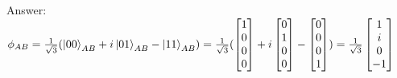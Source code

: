 \documentclass{article}
\begin{document}
\begin{enumerate}
          Answer:
          $\phi_{AB}=\frac{1}{\sqrt{3}}(\ket{00}_{AB} + i\ket{01}_{AB} - \ket{11}_{AB})
              \\=\frac{1}{\sqrt{3}}(
              \begin{bmatrix}
                  1 \\ 0 \\ 0 \\ 0 \\
              \end{bmatrix}
              +i\begin{bmatrix}
                  0 \\ 1 \\ 0 \\ 0 \\
              \end{bmatrix}
              -\begin{bmatrix}
                  0 \\ 0 \\ 0 \\ 1 \\
              \end{bmatrix})
              \\=\frac{1}{\sqrt{3}}\begin{bmatrix}
                  1 \\ i \\ 0 \\ -1 \\
              \end{bmatrix}
          $


\end{enumerate}
\end{document}
